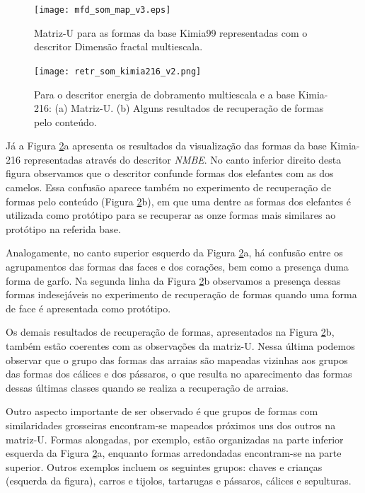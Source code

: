 \begin{figure}[h!]
  \caption{\label{fig:mfd_som_map} Matriz-U para as formas da base Kimia99 representadas com o descritor Dimensão fractal multiescala.}
  \centering
  \texttt{[image: mfd\_som\_map\_v3.eps]}
\end{figure}
  
\begin{figure}[h!]  \caption{\label{fig:som_kimia_216} Para o descritor energia de dobramento multiescala e a base Kimia-216: (a) Matriz-U. (b) Alguns resultados de recuperação de formas pelo conteúdo.}
  \centering
  \texttt{[image: retr\_som\_kimia216\_v2.png]}
\end{figure}

Já a Figura \ref{fig:som_kimia_216}a apresenta os resultados da visualização das formas da base Kimia-216 representadas através do descritor \emph{NMBE}. No canto inferior direito desta figura observamos que o descritor confunde formas dos elefantes com as dos camelos. Essa confusão aparece também no experimento de recuperação de formas pelo conteúdo (Figura \ref{fig:som_kimia_216}b), em que uma dentre as formas dos elefantes é utilizada como protótipo para se recuperar as onze formas mais similares ao protótipo na referida base.

Analogamente, no canto superior esquerdo da Figura \ref{fig:som_kimia_216}a, há confusão entre os agrupamentos das formas das faces e dos corações, bem como a presença duma forma de garfo. Na segunda linha da Figura \ref{fig:som_kimia_216}b observamos a presença dessas formas indesejáveis no experimento de recuperação de formas quando uma forma de face é apresentada como protótipo. 

Os demais resultados de recuperação de formas, apresentados na Figura \ref{fig:som_kimia_216}b, também estão coerentes com as observações da matriz-U. Nessa última podemos observar que o grupo das formas das arraias são mapeadas vizinhas aos grupos das formas dos cálices e dos pássaros, o que resulta no aparecimento das formas dessas últimas classes quando se realiza a recuperação de arraias. 

Outro aspecto importante de ser observado é que  grupos de formas com similaridades grosseiras encontram-se mapeados próximos uns dos outros na matriz-U. Formas alongadas, por exemplo, estão organizadas na parte inferior esquerda da Figura \ref{fig:som_kimia_216}a, enquanto formas arredondadas encontram-se na parte superior. Outros exemplos incluem os seguintes grupos: chaves e crianças (esquerda da figura), carros e tijolos, tartarugas e pássaros, cálices e sepulturas. 

